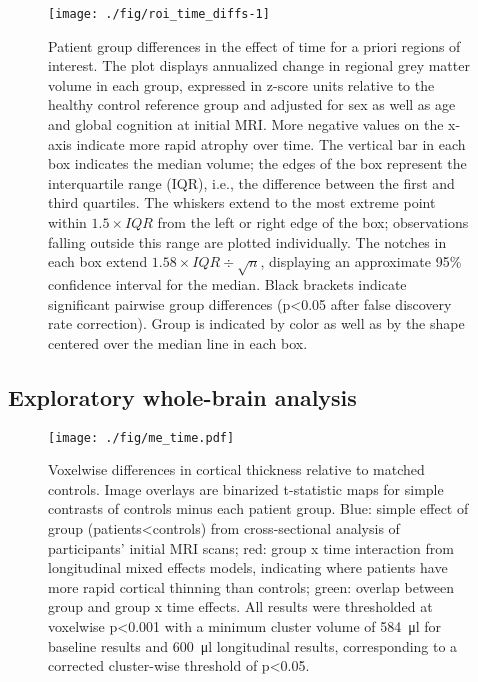 \documentclass[]{article}
\begin{document}
\begin{figure}

{\centering \texttt{[image: ./fig/roi\_time\_diffs-1]} 

}

\caption{Patient group differences in the effect of time for a priori regions of interest. The plot displays annualized change in regional grey matter volume in each group, expressed in z-score units relative to the healthy control reference group and adjusted for sex as well as age and global cognition at initial MRI. More negative values on the x-axis indicate more rapid atrophy over time. The vertical bar in each box indicates the median volume; the edges of the box represent the interquartile range (IQR), i.e., the difference between the first and third quartiles. The whiskers extend to the most extreme point within $1.5\times IQR$ from the left or right edge of the box; observations falling outside this range are plotted individually. The notches in each box extend $1.58\times IQR\div{\sqrt{n}}$, displaying an approximate 95\% confidence interval for the median. Black brackets indicate significant pairwise group differences (p<0.05 after false discovery rate correction). Group is indicated by color as well as by the shape centered over the median line in each box.}\label{fig:roi_time_diffs}
\end{figure}

\subsection*{Exploratory whole-brain
analysis}\label{exploratory-whole-brain-analysis}

\begin{figure}[]

{\centering \texttt{[image: ./fig/me\_time.pdf]} 

}

\caption[GM time effects]{Voxelwise differences in cortical thickness relative to matched controls. Image overlays are binarized t-statistic maps for simple contrasts of controls minus each patient group. Blue: simple effect of group (patients<controls) from cross-sectional analysis of participants' initial MRI scans; red: group x time interaction from longitudinal mixed effects models, indicating where patients have more rapid cortical thinning than controls; green: overlap between group and group x time effects. All results were thresholded at voxelwise p<0.001 with a minimum cluster volume of \SI{584}{\micro\litre} for baseline results and \SI{600}{\micro\litre} longitudinal results, corresponding to a corrected cluster-wise threshold of p<0.05. \label{gm_me_time}}

\end{figure}
\end{document}
